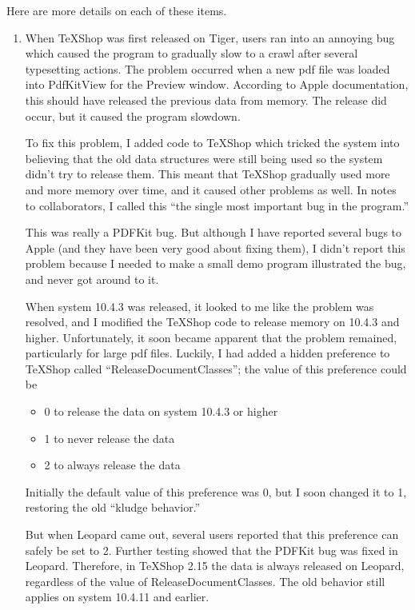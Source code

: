 \documentclass[11pt, oneside]{amsart}
\begin{document}
Here are more details on each of these items.

\begin{enumerate}
\item When TeXShop was first released on Tiger, users ran into an annoying bug which caused the program to gradually slow to a crawl after several typesetting actions. The problem occurred when a new pdf file was loaded into PdfKitView for the Preview window. According to Apple documentation, this should have released the previous data from memory. The release did occur, but it caused the program slowdown.

To fix this problem, I added code to TeXShop which tricked the system into believing that the old data structures were still being used so the system didn't try to release them. This meant that TeXShop gradually used more and more memory over time, and it caused other problems as well. In notes to collaborators, I called this ``the single most important bug in the program.'' 

This was really a PDFKit bug. But although I have reported several bugs to Apple (and they have been very good about fixing them), I didn't report this problem because I needed to make a small demo program illustrated the bug, and never got around to it.

When system 10.4.3 was released, it looked to me like the problem was resolved, and I modified the TeXShop code to release memory on 10.4.3 and higher. Unfortunately, it soon became apparent that the problem remained, particularly for large pdf files. Luckily, I had added a hidden preference to TeXShop called ``ReleaseDocumentClasses''; the value of this preference could be 
\begin{itemize}
\item 0 to release the data on system 10.4.3 or higher
\item 1 to never release the data
\item 2 to always release the data
\end{itemize}
Initially the default value of this preference was 0, but I soon changed it to 1, restoring the old ``kludge behavior.''

But when Leopard came out, several users reported that this preference can safely be set to 2. Further testing showed that the PDFKit bug was fixed in Leopard.
Therefore, in TeXShop 2.15 the data is always released on Leopard, regardless of the value of ReleaseDocumentClasses. The old behavior still applies on system 10.4.11 and earlier.


\end{enumerate}
\end{document}
